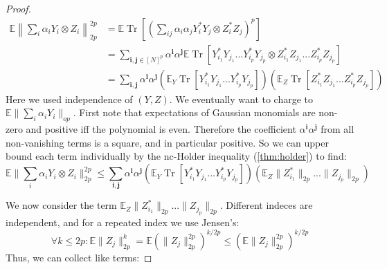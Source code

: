 \documentclass{article}
\newtheorem{claim}[theorem]{Claim}
\renewcommand{\vec}{\bm}
\newcommand{\E}{\mathbb{E}}
\newcommand\tr{\operatorname{Tr}}
\begin{document}
\begin{proof}
\begin{align*} \E \left\|\sum_{i} \alpha_{i} Y_{i} \otimes Z_{i}\right\|_{2p}^{2p} & = \E \tr \left[ \left( \sum_{ij} \alpha_{i} \alpha_{j} Y_{i}^{*} Y_{j} \otimes Z_{i}^{*} Z_{j} \right)^{p} \right]  \\
& = \sum_{\vec{i},\vec{j} \in [N]^{p}} \alpha^{\vec{i}} \alpha^{\vec{j}} \E \tr [ Y_{i_{1}}^{*} Y_{j_{1}} ... Y_{i_{p}}^{*} Y_{j_{p}} \otimes Z_{i_{1}}^{*} Z_{j_{1}} ... Z_{i_{p}}^{*} Z_{j_{p}}  ]   \\
& = \sum_{\vec{i},\vec{j}} \alpha^{\vec{i}} \alpha^{\vec{j}} (\E_{Y} \tr [ Y_{i_{1}}^{*} Y_{j_{1}} ... Y_{i_{p}}^{*} Y_{j_{p}} ] ) (\E_{Z} \tr [ Z_{i_{1}}^{*} Z_{j_{1}} ... Z_{i_{p}}^{*} Z_{j_{p}} ] )  
\end{align*}
Here we used independence of $(Y,Z)$. We eventually want to charge to $\E \|\sum_{i} \alpha_{i} Y_{i}\|_{op}$. First note that expectations of Gaussian monomials are non-zero and positive iff the polynomial is even. Therefore the coefficient $\alpha^{\vec{i}} \alpha^{\vec{j}}$ from all non-vanishing terms is a square, and in particular positive. So we can upper bound each term individually by the nc-Holder inequality (\cref{thm:holder}) to find: 
\[\E \|\sum_{i} \alpha_{i} Y_{i} \otimes Z_{i}\|_{2p}^{2p} \leq \sum_{\vec{i},\vec{j}} \alpha^{\vec{i}} \alpha^{\vec{j}} (\E_{Y} \tr [ Y_{i_{1}}^{*} Y_{j_{1}} ... Y_{i_{p}}^{*} Y_{j_{p}} ] ) ( \E_{Z} \|Z_{i_{1}}^{*}\|_{2p} ... \|Z_{j_{p}}\|_{2p} )  \]

We now consider the term $\E_{Z} \|Z_{i_{1}}^{*}\|_{2p} ... \|Z_{j_{p}}\|_{2p}$. Different indeces are independent, and for a repeated index we use Jensen's: 
\[ \forall k \leq 2p: \E \|Z_j\|_{2p}^{k} = \E (\|Z_j\|_{2p}^{2p})^{k/{2p}} \leq  ( \E \|Z_j\|_{2p}^{2p} )^{k/2p}  \] 
Thus, we can collect like terms:



\end{proof}
\end{document}
